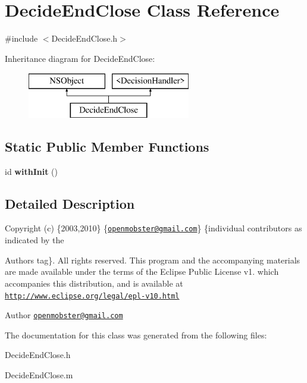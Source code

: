 \hypertarget{interface_decide_end_close}{
\section{\-Decide\-End\-Close \-Class \-Reference}
\label{interface_decide_end_close}
}


{\ttfamily \#include $<$\-Decide\-End\-Close.\-h$>$}

\-Inheritance diagram for \-Decide\-End\-Close\-:\begin{figure}[H]
\begin{center}
\leavevmode
\includegraphics[height=2.000000cm]{interface_decide_end_close}
\end{center}
\end{figure}
\subsection*{\-Static \-Public \-Member \-Functions}
\begin{DoxyCompactItemize}
\item 
\hypertarget{interface_decide_end_close_acbba1d037731845b1b1b919f043f2aca}{
id {\bfseries with\-Init} ()}
\label{interface_decide_end_close_acbba1d037731845b1b1b919f043f2aca}

\end{DoxyCompactItemize}


\subsection{\-Detailed \-Description}
\-Copyright (c) \{2003,2010\} \{\href{mailto:openmobster@gmail.com}{\tt openmobster@gmail.\-com}\} \{individual contributors as indicated by the \begin{DoxyAuthor}{\-Authors}
tag\}. \-All rights reserved. \-This program and the accompanying materials are made available under the terms of the \-Eclipse \-Public \-License v1. which accompanies this distribution, and is available at \href{http://www.eclipse.org/legal/epl-v10.html}{\tt http\-://www.\-eclipse.\-org/legal/epl-\/v10.\-html}
\end{DoxyAuthor}
\begin{DoxyAuthor}{\-Author}
\href{mailto:openmobster@gmail.com}{\tt openmobster@gmail.\-com} 
\end{DoxyAuthor}


\-The documentation for this class was generated from the following files\-:\begin{DoxyCompactItemize}
\item 
\-Decide\-End\-Close.\-h\item 
\-Decide\-End\-Close.\-m\end{DoxyCompactItemize}
